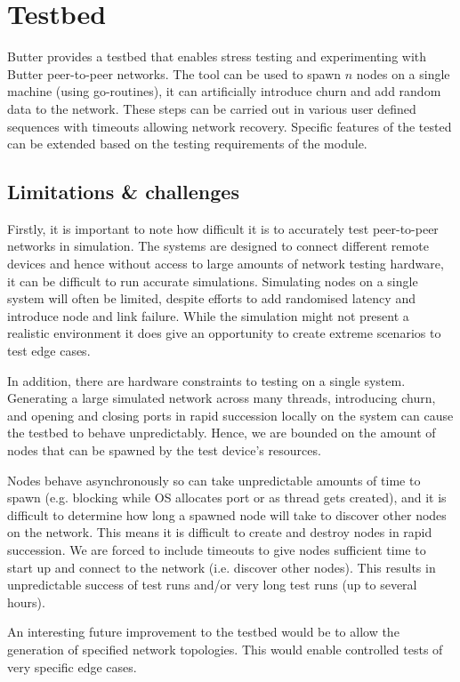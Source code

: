 \newpage
\section{Testbed}
\label{sec:testbed}

Butter provides a testbed that enables stress testing and experimenting with Butter peer-to-peer networks. The tool can be used to spawn $n$ nodes on a single machine (using go-routines), it can artificially introduce churn and add random data to the network. These steps can be carried out in various user defined sequences with timeouts allowing network recovery. Specific features of the tested can be extended based on the testing requirements of the module.

\subsection{Limitations \& challenges}

Firstly, it is important to note how difficult it is to accurately test peer-to-peer networks in simulation\cite{almeida2008framework}. The systems are designed to connect different remote devices and hence without access to large amounts of network testing hardware, it can be difficult to run accurate simulations. Simulating nodes on a single system will often be limited, despite efforts to add randomised latency and introduce node and link failure. While the simulation might not present a realistic environment it does give an opportunity to create extreme scenarios to test edge cases.


In addition, there are hardware constraints to testing on a single system. Generating a large simulated network across many threads, introducing churn, and opening and closing ports in rapid succession locally on the system can cause the testbed to behave unpredictably. Hence, we are bounded on the amount of nodes that can be spawned by the test device's resources.

Nodes behave asynchronously so can take unpredictable amounts of time to spawn (e.g. blocking while OS allocates port or as thread gets created), and it is difficult to determine how long a spawned node will take to discover other nodes on the network. This means it is difficult to create and destroy nodes in rapid succession. We are forced to include timeouts to give nodes sufficient time to start up and connect to the network (i.e. discover other nodes). This results in unpredictable success of test runs and/or very long test runs (up to several hours).

An interesting future improvement to the testbed would be to allow the generation of specified network topologies\cite{zeinalipour2005peerware}. This would enable controlled tests of very specific edge cases.